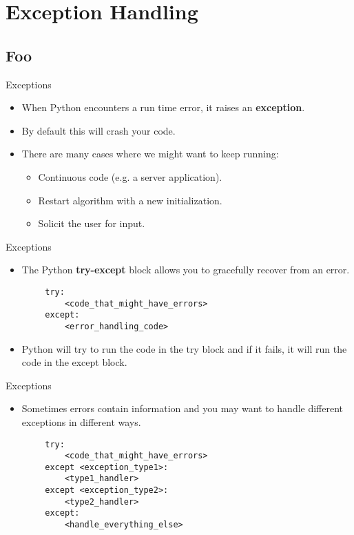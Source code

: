 \documentclass[serif,xcolor=pdftex,dvipsnames,table,hyperref={bookmarks=false,breaklinks}]{beamer}
\begin{document}
\section{Exception Handling}
\subsection{Foo}

\begin{frame}[t,fragile]{Exceptions}
	\begin{itemize}[<+->]
		\item When Python encounters a run time error, it raises an \textbf{exception}.
		\item By default this will crash your code.
		\item There are many cases where we might want to keep running:
		\begin{itemize}[<+->]
			\item Continuous code (e.g. a server application).
			\item Restart algorithm with a new initialization.
			\item Solicit the user for input.
		\end{itemize}
	\end{itemize}
\end{frame}

\begin{frame}[t,fragile]{Exceptions}
	\begin{itemize}[<+->]
		\item The Python \textbf{try-except} block allows you to gracefully recover from an error.
	\end{itemize}
	\pause
	\begin{lstlisting}
		try:
		    <code_that_might_have_errors>
		except:
		    <error_handling_code>
	\end{lstlisting}
	\pause
	\begin{itemize}[<+->]
		\item Python will try to run the code in the try block and if it fails, it will run the code in the except block.
	\end{itemize}
\end{frame}

\begin{frame}[t,fragile]{Exceptions}
	\begin{itemize}[<+->]
		\item Sometimes errors contain information and you may want to handle different exceptions in different ways.
	\end{itemize}
	\pause
	\begin{lstlisting}
		try:
		    <code_that_might_have_errors>
		except <exception_type1>:
		    <type1_handler>
		except <exception_type2>:
		    <type2_handler>
		except:
		    <handle_everything_else>
	\end{lstlisting}
\end{frame}
\end{document}
